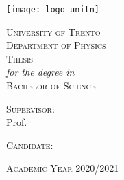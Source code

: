 
\graphicspath{{Frontmatter/figures/PNG/}{Frontmatter/figures/PDF/}{Frontmatter/figures/}}

\begin{titlepage}
	
	\begin{center}
	
		\texttt{[image: logo\_unitn]}\\[0.4cm]
			
		\vspace{0.8cm}
		
		{ \Huge \scshape University of Trento }\\[0.25cm]
		{ \Large \scshape Department of Physics }\\[2cm]

		{ \Large \scshape Thesis }\\[0.05cm]
		{ \itshape for the degree in }\\[0.05cm]
		{ \Large \scshape Bachelor of Science }\\[2cm]
		
		
		{ \huge \bfseries \THtitle }
		
		\vfill
				
		\begin{minipage}[t]{0.45\textwidth}
			\begin{flushleft} %
				{ \large \scshape Supervisor: } \\[0.25cm]
				{ Prof. \THsupervisor }\\[0.10cm]
			\end{flushleft}
		\end{minipage}
		\begin{minipage}[t]{0.45\textwidth}
			\begin{flushright} %
				{ \large \scshape Candidate: }\\[0.25cm]
				{ \THauthor }
			\end{flushright}
		\end{minipage}
		
		\vspace{2cm}
		
		{\large \scshape Academic Year 2020/2021}
		
	\end{center}
	
	\restoregeometry
\end{titlepage}